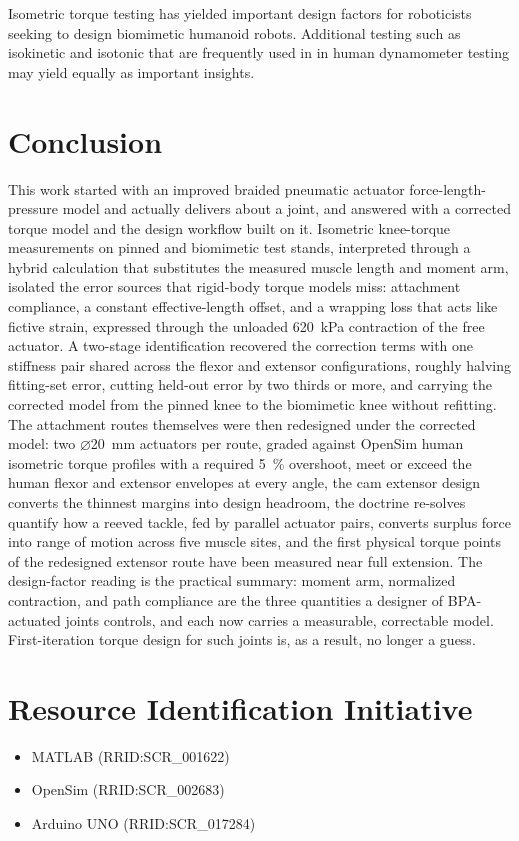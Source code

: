 \documentclass[utf8]{FrontiersinHarvard} %
\begin{document}
 Isometric torque testing has yielded important design factors for roboticists seeking to design biomimetic humanoid robots. Additional testing such as isokinetic and isotonic that are frequently used in in human dynamometer testing may yield equally as important insights.

\section{Conclusion}\label{sec:conclusion}

This work started with an improved braided pneumatic actuator force-length-pressure model and actually delivers about a joint, and answered with a corrected torque model and the design workflow built on it. Isometric knee-torque measurements on pinned and biomimetic test stands, interpreted through a hybrid calculation that substitutes the measured muscle length and moment arm, isolated the error sources that rigid-body torque models miss: attachment compliance, a constant effective-length offset, and a wrapping loss that acts like fictive strain, expressed through the unloaded \qty{620}{\kPa} contraction of the free actuator. A two-stage identification recovered the correction terms with one stiffness pair shared across the flexor and extensor configurations, roughly halving fitting-set error, cutting held-out error by two thirds or more, and carrying the corrected model from the pinned knee to the biomimetic knee without refitting. The attachment routes themselves were then redesigned under the corrected model: two $\diameter$\qty{20}{\mm} actuators per route, graded against OpenSim human isometric torque profiles with a required \qty{5}{\percent} overshoot, meet or exceed the human flexor and extensor envelopes at every angle, the cam extensor design converts the thinnest margins into design headroom, the doctrine re-solves quantify how a reeved tackle, fed by parallel actuator pairs, converts surplus force into range of motion across five muscle sites, and the first physical torque points of the redesigned extensor route have been measured near full extension. The design-factor reading is the practical summary: moment arm, normalized contraction, and path compliance are the three quantities a designer of BPA-actuated joints controls, and each now carries a measurable, correctable model. First-iteration torque design for such joints is, as a result, no longer a guess.

\section*{Resource Identification Initiative}
\begin{itemize}
    \item MATLAB (RRID:SCR\_001622)
    \item OpenSim (RRID:SCR\_002683)
    \item Arduino UNO (RRID:SCR\_017284)
\end{itemize}
\end{document}

